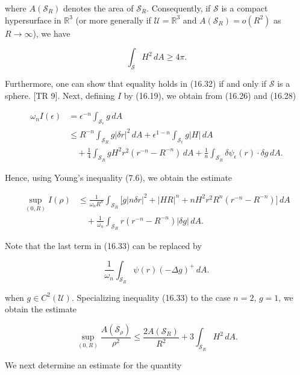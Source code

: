 
where $A(\mathcal{S}_R)$ denotes the area of $\mathcal{S}_R$. Consequently, if $\mathcal{S}$ is a compact hypersurface
in $\mathbb{R}^3$ (or more generally if $\mathcal{U}=\mathbb{R}^3$ and $A(\mathcal{S}_R)=o(R^2)$ as $R\to\infty$), we have

\begin{equation}
\int_{\mathcal{S}} H^2\,dA \geq 4\pi.
\tag{16.32}
\end{equation}

Furthermore, one can show that equality holds in (16.32) if and only if $\mathcal{S}$ is a
sphere. [TR 9].
Next, defining $I$ by (16.19), we obtain from (16.26) and (16.28)

\begin{align*}
\omega_n I(\epsilon)&=\epsilon^{-n}\int_{\mathcal{S}_\epsilon} g\,dA\\
&\leq R^{-n}\int_{\mathcal{S}_R} g|\delta r|^2\,dA+\epsilon^{1-n}\int_{\mathcal{S}_\epsilon} g|H|\,dA\\
&\quad+\frac{1}{4}\int_{\mathcal{S}_R} gH^2r^2(r^{-n}-R^{-n})\,dA+\frac{1}{n}\int_{\mathcal{S}_R} \delta\psi_\epsilon(r)\cdot\delta g\,dA.
\end{align*}

Hence, using Young's inequality (7.6), we obtain the estimate

\begin{align}
\sup_{(0,R)} I(\rho)&\leq \frac{1}{\omega_n R^n}\int_{\mathcal{S}_R}\big[g|n\delta r|^2+|HR|^n+nH^2r^2R^n(r^{-n}-R^{-n})\big]\,dA\\
&\quad+\frac{1}{\omega_n}\int_{\mathcal{S}_R} r(r^{-n}-R^{-n})|\delta g|\,dA.
\tag{16.33}
\end{align}

Note that the last term in (16.33) can be replaced by

\begin{equation*}
\frac{1}{\omega_n}\int_{\mathcal{S}_R}\psi(r)(-\Delta g)^+\,dA.
\end{equation*}

when $g\in C^2(\mathcal{U})$. Specializing inequality (16.33) to the case $n=2$, $g=1$, we obtain
the estimate

\begin{equation}
\sup_{(0,R)} \frac{A(\mathcal{S}_\rho)}{\rho^2}\leq \frac{2A(\mathcal{S}_R)}{R^2}+3\int_{\mathcal{S}_R} H^2\,dA.
\tag{16.34}
\end{equation}

We next determine an estimate for the quantity

